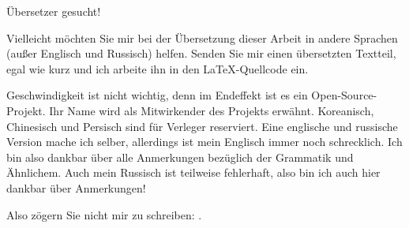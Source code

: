 \vspace*{\fill}

\Huge Übersetzer gesucht!

\normalsize

\bigskip
\bigskip
\bigskip

Vielleicht möchten Sie mir bei der Übersetzung dieser Arbeit in andere Sprachen (außer Englisch und
Russisch) helfen. Senden Sie mir einen übersetzten Textteil, egal wie kurz und ich arbeite ihn in den
\LaTeX{}-Quellcode ein.

\iffalse
Für diejenigen die keine Angst vor \TeX{} haben: \href{https://github.com/dennis714/RE-for-beginners/blob/master/Translation.md}{hier lesen}.
Für diejenigen die Zweifel haben: Öffnen Sie die PDF-Datei einfach in OpenOffice und überarbeiten Sie den Text Satzweise.
Ich werde den Text dann in den \LaTeX{}-Code zurückkopieren.
Es gibt noch einen besseren Weg: meiner Erfahrung nach, können Sie Ihre Motivation durch die Übersetzung von kurzen Stücken meines Buches und dem posten auf Ihrem Blog oder Ihren Blogs erhöhen. 
Ich kann die URL zu diesen Posts über meinen Twitter-Account posten: (\href{http://twitter.com/yurichev}{@yurichev}).
\fi

Geschwindigkeit ist nicht wichtig, denn im Endeffekt ist es ein Open-Source-Projekt.
Ihr Name wird als Mitwirkender des Projekts erwähnt.
Koreanisch, Chinesisch und Persisch sind für Verleger reserviert.
Eine englische und russische Version mache ich selber, allerdings ist mein Englisch immer noch schrecklich.
Ich bin also dankbar über alle Anmerkungen bezüglich der Grammatik und Ähnlichem.
Auch mein Russisch ist teilweise fehlerhaft, also bin ich auch hier dankbar über Anmerkungen!%

Also zögern Sie nicht mir zu schreiben: \GTT{\EMAIL}.

\vspace*{\fill}
\vfill
